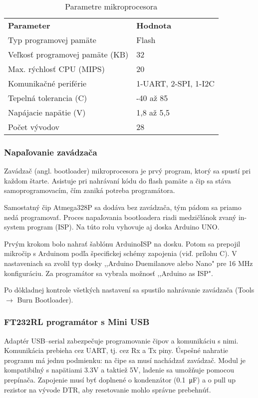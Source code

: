 \documentclass[titlepage,12pt]{article}
\begin{document}
\begin{table}[htb]
\caption{Parametre mikroprocesora}
\begin{tabular}{ll}
\\
\textbf{Parameter}              & \textbf{Hodnota}     \\
Typ programovej pamäte          & Flash                \\
Veľkosť programovej pamäte (KB) & 32                   \\
Max. rýchlosť CPU (MIPS)        & 20                   \\
Komunikačné periférie           & 1-UART, 2-SPI, 1-I2C \\
Tepelná tolerancia (C)          & -40 až 85            \\
Napájacie napätie (V)           & 1,8 až 5,5           \\
Počet vývodov                   & 28                  
\end{tabular}
\end{table}

\subsubsection*{Napaľovanie zavádzača}
Zavádzač (angl. bootloader) mikroprocesora je prvý program, ktorý sa spustí pri každom štarte. Asistuje pri nahrávaní kódu do flash pamäte a čip sa stáva samoprogramovacím, čím zaniká potreba programátora.

Samostatný čip Atmega328P sa dodáva bez zavádzača, tým pádom sa priamo nedá programovať. Proces napaľovania bootloadera riadi medzičlánok zvaný in-system program (ISP). Na túto rolu vyhovuje aj doska Arduino UNO.

Prvým krokom bolo nahrať šablónu ArduinoISP na dosku. Potom sa prepojil mikročip \linebreak s Arduinom podľa špecifickej schémy zapojenia (viď. prílohu C). V nastaveniach sa zvolil typ dosky ,,Arduino Duemilanove alebo Nano" pre 16 MHz konfiguráciu. Za programátor sa \linebreak vybrala možnosť ,,Arduino as ISP".

Po dôkladnej kontrole všetkých nastavení sa spustilo nahrávanie zavádzača (Tools $\rightarrow$ Burn Bootloader).


\newpage
\subsubsection*{FT232RL programátor s Mini USB}
Adaptér USB–serial zabezpečuje programovanie čipov a komunikáciu s nimi. Komunikácia prebieha cez UART, tj. cez Rx a Tx piny. Úspešné nahratie programu má jednu podmienku: na čipe sa musí nachádzať zavádzač. Modul je kompatibilný s napätiami 3.3V a taktiež 5V, ladenie sa umožňuje pomocou prepínača. Zapojenie musí byť doplnené o kondenzátor (\SI{0,1}{\micro\F}) a o pull up rezistor na vývode DTR, aby resetovanie mohlo správne prebehnúť.
\end{document}
